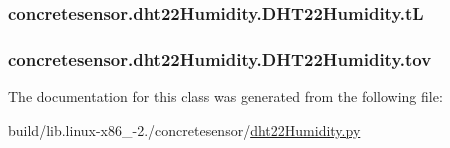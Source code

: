 \subsubsection[{t\+L}]{\setlength{\rightskip}{0pt plus 5cm}concretesensor.\+dht22\+Humidity.\+D\+H\+T22\+Humidity.\+t\+L}\label{classconcretesensor_1_1dht22Humidity_1_1DHT22Humidity_a080741570bfe3eb9f95a04046d7e839c}
\hypertarget{classconcretesensor_1_1dht22Humidity_1_1DHT22Humidity_addc18bf7bbe4daff1b945c7266c9bf78}{}
\subsubsection[{tov}]{\setlength{\rightskip}{0pt plus 5cm}concretesensor.\+dht22\+Humidity.\+D\+H\+T22\+Humidity.\+tov}\label{classconcretesensor_1_1dht22Humidity_1_1DHT22Humidity_addc18bf7bbe4daff1b945c7266c9bf78}


The documentation for this class was generated from the following file\+:\begin{DoxyCompactItemize}
\item 
build/lib.\+linux-\/x86\+\_-\/2./concretesensor/\hyperlink{build_2lib_8linux-x86__64-2_87_2concretesensor_2dht22Humidity_8py}{dht22\+Humidity.\+py}\end{DoxyCompactItemize}
